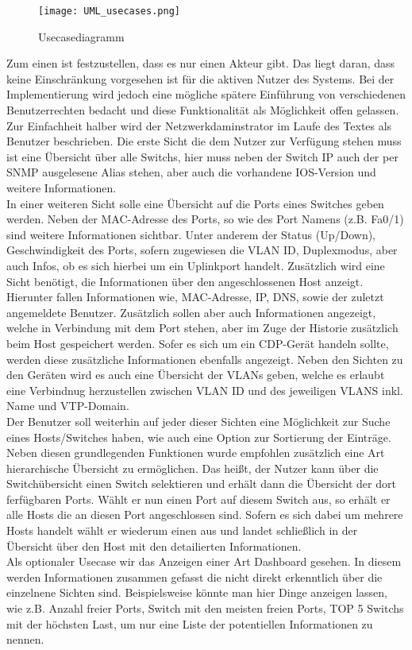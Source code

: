 \begin{figure}[H]
\centering
\texttt{[image: UML\_usecases.png]}
\caption{Usecasediagramm}
\label{fig:usecase001}
\end{figure}

Zum einen ist festzustellen, dass es nur einen Akteur gibt. Das liegt daran, dass keine Einschränkung vorgesehen ist für die aktiven Nutzer des Systems. Bei der Implementierung wird jedoch eine mögliche spätere Einführung von verschiedenen Benutzerrechten bedacht und diese Funktionalität als Möglichkeit offen gelassen. Zur Einfachheit halber wird der Netzwerkdaminstrator im Laufe des Textes als Benutzer beschrieben.
Die erste Sicht die dem Nutzer zur Verfügung stehen muss ist eine Übersicht über alle Switchs, hier muss neben der Switch IP auch der per SNMP ausgelesene Alias stehen, aber auch die vorhandene IOS-Version und weitere Informationen.\\
In einer weiteren Sicht solle eine Übersicht auf die Ports eines Switches geben werden.
Neben der MAC-Adresse des Ports, so wie des Port Namens (z.B. Fa0/1) sind weitere Informationen sichtbar. Unter anderem der Status (Up/Down), Geschwindigkeit des Ports, sofern zugewiesen die VLAN ID, Duplexmodus, aber auch Infos, ob es sich hierbei um ein Uplinkport handelt.
Zusätzlich wird eine Sicht benötigt, die Informationen über den angeschlossenen Host anzeigt. Hierunter fallen Informationen wie, MAC-Adresse, IP, DNS, sowie der zuletzt angemeldete Benutzer. Zusätzlich sollen aber auch Informationen angezeigt, welche in Verbindung mit dem Port stehen, aber im Zuge der Historie zusätzlich beim Host gespeichert werden. Sofer es sich um ein CDP-Gerät handeln sollte, werden diese zusätzliche Informationen ebenfalls angezeigt.
Neben den Sichten zu den Geräten wird es auch eine Übersicht der VLANs geben, welche es erlaubt eine Verbindnug herzustellen zwischen VLAN ID und des jeweiligen VLANS inkl. Name und  VTP-Domain.\\
Der Benutzer soll weiterhin auf jeder dieser Sichten eine Möglichkeit zur Suche eines Hosts/Switches haben, wie auch eine Option zur Sortierung der Einträge.
Neben diesen grundlegenden Funktionen wurde empfohlen zusätzlich eine Art hierarchische Übersicht zu ermöglichen. Das heißt, der Nutzer kann über die Switchübersicht einen Switch selektieren und erhält dann die Übersicht der dort ferfügbaren Ports. Wählt er nun einen Port auf diesem Switch aus, so erhält er alle Hosts die an diesen Port angeschlossen sind. Sofern es sich dabei um mehrere Hosts handelt wählt er wiederum einen aus und landet schließlich in der Übersicht über den Host mit den detailierten Informationen.\\
Als optionaler Usecase wir das Anzeigen einer Art Dashboard gesehen. In diesem werden Informationen zusammen gefasst die nicht direkt erkenntlich über die einzelnene Sichten sind. Beispielsweise könnte man hier Dinge anzeigen lassen, wie z.B. Anzahl freier Ports, Switch mit den meisten freien Ports, TOP 5 Switchs mit der höchsten Last, um nur eine Liste der potentiellen Informationen zu nennen.

